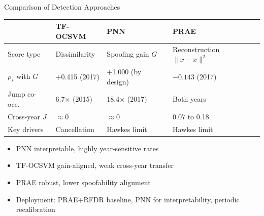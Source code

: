 \documentclass{beamer}
\begin{document}
\begin{frame}{Comparison of Detection Approaches}
    \begin{table}[h]
    \centering
    \footnotesize
    \begin{tabular}{lp{2.5cm}p{2.5cm}p{2.5cm}}
    \toprule
    & \textbf{TF-OCSVM} & \textbf{PNN} & \textbf{PRAE} \\
    \midrule
    Score type     & Dissimilarity       & Spoofing gain $G$    & Reconstruction $\|x - \hat{x}\|^2$ \\
    $\rho_s$ with $G$ & +0.415 (2017)    & +1.000 (by design)  & $-0.143$ (2017) \\
    Jump co-occ.   & 6.7$\times$ (2015)   & 18.4$\times$ (2017) & Both years \\
    Cross-year $J$ & $\approx 0$          & $\approx 0$          & 0.07 to 0.18 \\
    Key drivers    & Cancellation         & Hawkes limit         & Hawkes limit \\
    \bottomrule
    \end{tabular}
    \end{table}
    \vspace{0.15cm}
    \begin{itemize}
        \item PNN interpretable, highly year-sensitive rates
        \item TF-OCSVM gain-aligned, weak cross-year transfer
        \item PRAE robust, lower spoofability alignment
        \item Deployment: PRAE+RFDR baseline, PNN for interpretability, periodic recalibration
    \end{itemize}
\end{frame}
\end{document}
